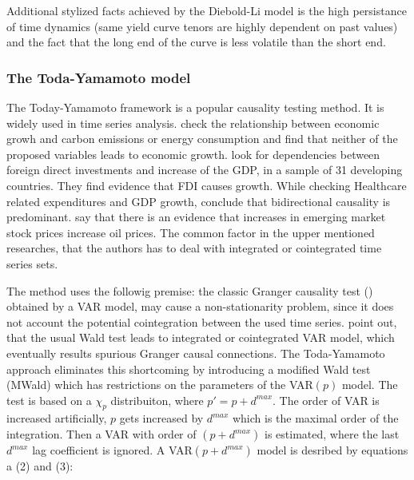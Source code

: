 \documentclass[12pt,bibliography=totoc]{article}
\begin{document}
Additional stylized facts achieved by the Diebold-Li model is the high persistance of time dynamics (same yield curve tenors are highly dependent on past values) and the fact that the long end of the curve is less volatile than the short end.


\subsubsection{The Toda-Yamamoto model}

{The Today-Yamamoto framework is a popular causality testing method. It is widely used in time series analysis. \cite{zhang2009energy} check the relationship between economic growh and carbon emissions or energy consumption and find that neither of the proposed variables leads to economic growth. \cite{hansen2006causal} look for dependencies between foreign direct investments and increase of the GDP, in a sample of 31 developing countries. They find evidence that FDI causes growth.  While checking Healthcare related expenditures and GDP growth, \cite{amiri2012granger} conclude that bidirectional causality is predominant. \cite{basher2012oil} say that there is an evidence that increases in emerging market stock prices increase oil prices. The common factor in the upper mentioned researches, that the authors has to deal with integrated or cointegrated time series sets.

The \cite{toda1995statistical} method uses the followig premise: the classic Granger causality test (\cite{granger1969investigating}) obtained by a VAR model, may cause a non-stationarity problem, since it does not account the potential cointegration between the used time series.
\cite{toda1995statistical} point out, that the usual Wald test leads to integrated or cointegrated VAR model, which eventually results spurious Granger causal connections. The Toda-Yamamoto approach eliminates this shortcoming by introducing a modified Wald test (MWald) which has restrictions on the parameters of the VAR$(p)$ model. The test is based on a  $\chi_{p}$  distribuiton, where $p' = p + d^{max}$. The order of VAR is increased artificially, $p$ gets increased by $d^{max}$ which is the maximal order of the integration. Then a VAR with order of $(p + d^{max})$ is estimated, where the last  $d^{max}$ lag coefficient is ignored. A VAR$(p + d^{max})$  model is desribed by equations a (2) and (3):

}
\end{document}
